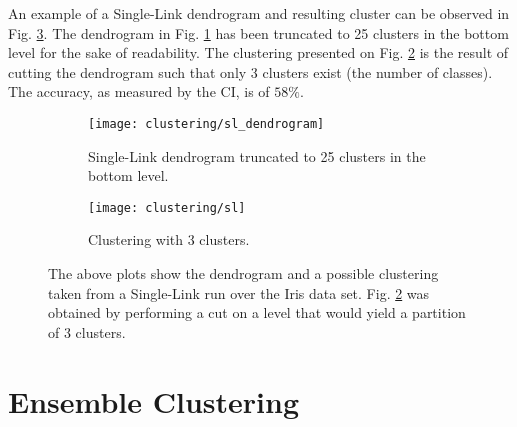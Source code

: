 An example of a Single-Link dendrogram and resulting cluster can be observed in Fig. \ref{fig:sl plots}.
The dendrogram in Fig. \ref{fig:sl dendrogram} has been truncated to 25 clusters in the bottom level for the sake of readability.
The clustering presented on Fig. \ref{fig:sl clustering} is the result of cutting the dendrogram such that only 3 clusters exist (the number of classes).
The accuracy, as measured by the CI, is of $58\%$.

\begin{figure}[!ht]
    \centering
    \begin{subfigure}[b]{0.45\textwidth}
        \centering
        \texttt{[image: clustering/sl\_dendrogram]}
        \caption{Single-Link dendrogram truncated to 25 clusters in the bottom level.}
        \label{fig:sl dendrogram}
    \end{subfigure}
    \begin{subfigure}[b]{0.45\textwidth}
        \centering
        \texttt{[image: clustering/sl]}
        \caption{Clustering with 3 clusters.}
        \label{fig:sl clustering}
    \end{subfigure}

    \caption{The above plots show the dendrogram and a possible clustering taken from a Single-Link run over the Iris data set. Fig. \ref{fig:sl clustering} was obtained by performing a cut on a level that would yield a partition of 3 clusters.}
    \label{fig:sl plots}
\end{figure}





%
%

\section{Ensemble Clustering}
\label{sec:ensemble}

